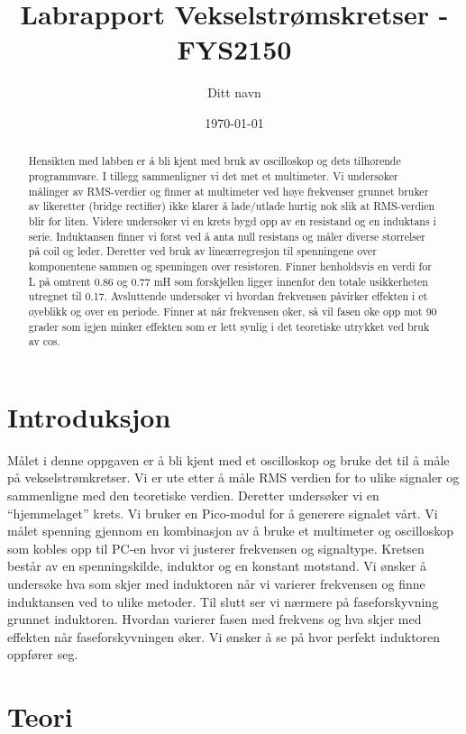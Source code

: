 \documentclass[norsk,a4paper,12pt]{article}
\title{Labrapport Vekselstrømskretser - FYS2150}
\author{Ditt navn}
\date{\today}
\begin{document}
\maketitle

\begin{abstract}
Hensikten med labben er å bli kjent med bruk av oscilloskop og dets tilhørende programmvare. I tillegg sammenligner vi det met et multimeter. Vi undersøker målinger av RMS-verdier og finner at multimeter ved høye frekvenser grunnet bruker av likeretter (bridge rectifier) ikke klarer å lade/utlade hurtig nok slik at RMS-verdien blir for liten. Videre undersøker vi en krets bygd opp av en resistand og en induktans i serie. Induktansen finner vi først ved å anta null resistans og måler diverse størrelser på coil og leder. Deretter ved bruk av lineærregresjon til spenningene over komponentene sammen og spenningen over resistoren. Finner henholdsvis en verdi for L på omtrent 0.86 og 0.77 mH som forskjellen ligger innenfor den totale usikkerheten utregnet til 0.17. Avsluttende undersøker vi hvordan frekvensen påvirker effekten i et øyeblikk og over en periode. Finner at når frekvensen øker, så vil fasen øke opp mot 90 grader som igjen minker effekten som er lett synlig i det teoretiske utrykket ved bruk av cos. 

\end{abstract}

\section{Introduksjon}
Målet i denne oppgaven er å bli kjent med et oscilloskop og bruke det til å måle på vekselstrømkretser. Vi er ute etter å måle RMS verdien for to ulike signaler og sammenligne med den teoretiske verdien.  Deretter undersøker vi en “hjemmelaget” krets. Vi bruker en Pico-modul for å generere signalet vårt. Vi målet spenning gjennom en kombinasjon av å bruke et multimeter og oscilloskop som kobles opp til PC-en hvor vi justerer frekvensen og signaltype. Kretsen består av en spenningskilde, induktor og en konstant motstand. Vi ønsker å undersøke hva som skjer med induktoren når vi varierer frekvensen og finne induktansen ved to ulike metoder. Til slutt ser vi nærmere på faseforskyvning grunnet induktoren. Hvordan varierer fasen med frekvens og hva skjer med effekten når faseforskyvningen øker. Vi ønsker å se på hvor perfekt induktoren oppfører seg.


\section{Teori}
\end{document}
